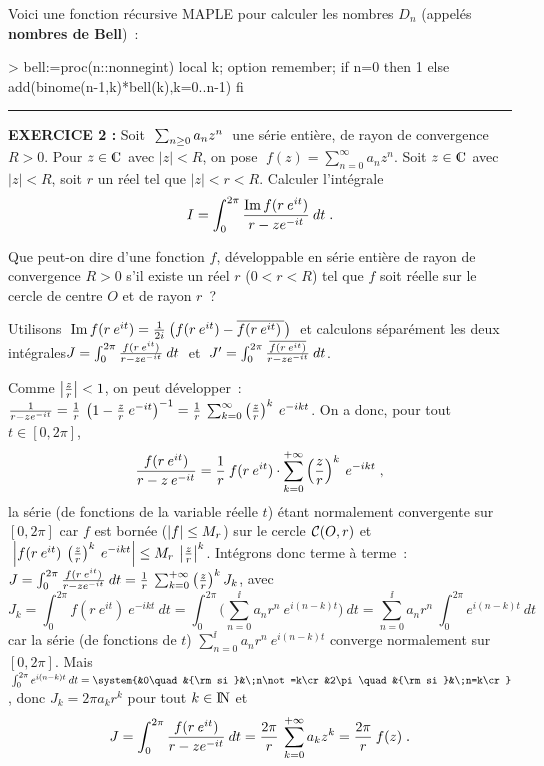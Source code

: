 \documentclass{article}
\begin{document}
Voici une fonction r\'ecursive MAPLE pour calculer les nombres $D_n$ (appel\'es
{\bf nombres de Bell})~:\msk

{\info
 >  bell:=proc(n::nonnegint) local k; option remember;
         if n=0   then 1
 else add(binome(n-1,k)*bell(k),k=0..n-1)
  fi
}

\bsk
\hrule
\bsk

{\bf EXERCICE 2 :}\msk
Soit $\;\sum_{n\geq0}a_nz^n\;$ une s\'erie enti\`ere, de rayon de convergence $R>0$.\msk
Pour $z\in\cmat$ avec $|z|<R$, on pose $\;f(z)=\sum_{n=0}^{\infty}a_nz^n$.\msk
Soit $z\in\cmat$ avec $|z|<R$, soit $r$ un r\'eel tel que $|z|<r<R$. Calculer l'int\'egrale\vv
$$I=\int_0^{2\pi}{\mathop{\rm Im}\nolimits f(r\>e^{it})\over r-ze^{-it}}\>dt\;.$$\par
Que peut-on dire d'une fonction $f$, d\'eveloppable en s\'erie enti\`ere de rayon de convergence $R>0$ s'il existe un r\'eel $r$ ($0<r<R$) tel que $f$ soit r\'eelle sur le cercle de centre $O$ et de rayon $r$~?

\msk
\cl{- - - - - - - - - - - - - - - - - - - - - - - - - - - - - - -}
\msk

Utilisons $\;\mathop{\rm Im}\nolimits f(r\>e^{it})={1\over 2i}\>\big(f(r\>e^{it})-\overline{f(r\>e^{it})\>}\big)\;$ et calculons s\'epar\'ement les deux int\'egrales\ssk\new $J=\int_0^{2\pi}{f(r\>e^{it})\over r-ze^{-it}}\>dt\;$
et $\;J'=\int_0^{2\pi}{\overline{f(r\>e^{it})}\over r-ze^{-it}}\>dt$.

\msk
Comme $\left|{z\over r}\right|<1$, on peut d\'evelopper~: ${1\over r-ze^{-it}}={1\over r}\>\left(1-{z\over r}\>e^{-it}\right)^{-1}={1\over r}\>\sum_{k=0}^{\infty}\left({z\over r}\right)^k\>e^{-ikt}$. On a donc, pour tout $t\in[0,2\pi]$,\vv
$${f(r\>e^{it})\over r-z\>e^{-it}}={1\over r}\>f(r\>e^{it})\cdot\sum_{k=0}^{+\infty}\left({z\over r}\right)^k\>e^{-ikt}\;,$$
la s\'erie (de fonctions de la variable r\'eelle $t$) \'etant normalement convergente sur $[0,2\pi]$ car $f$ est born\'ee ($|f|\leq M_r$) sur le cercle ${\cal C}(O,r)$ et $\;\left|f(r\>e^{it})\>\left({z\over r}\right)^k\>e^{-ikt}\right|\leq M_r\>\left|{z\over r}\right|^k$.
\ssk
Int\'egrons donc terme \`a terme~: $J=\int_0^{2\pi}{f(r\>e^{it})\over r-ze^{-it}}\>dt={1\over r}\>\sum_{k=0}^{+\infty}\left({z\over r}\right)^kJ_k$, avec
$$J_k = \int_0^{2\pi}f(r\>e^{it})\>e^{-ikt}\>dt = \int_0^{2\pi}\Big(\sum_{n=0}^{\ii}a_nr^n\>e^{i(n-k)t}\Big)\>dt
                                  = \sum_{n=0}^{\ii}a_nr^n\>\int_0^{2\pi}e^{i(n-k)t}\>dt$$
car la s\'erie (de fonctions de $t$) $\sum_{n=0}^{\ii}a_nr^n\>e^{i(n-k)t}$ converge normalement sur $[0,2\pi]$. Mais $\;\int_0^{2\pi}e^{i(n-k)t}\>dt=\system{&0\quad&{\rm si }&\;n\not=k\cr
&2\pi\quad&{\rm si }&\;n=k\cr}$, donc $J_k=2\pi a_kr^k$ pour tout $k\in{\rm I\kern-0.5mm N}$ et
$$J=\int_0^{2\pi}{f(r\>e^{it})\over r-ze^{-it}}\>dt={2\pi\over r}\>\sum_{k=0}^{+\infty}a_k z^k={2\pi\over r}\>f(z)\;.$$
\end{document}
